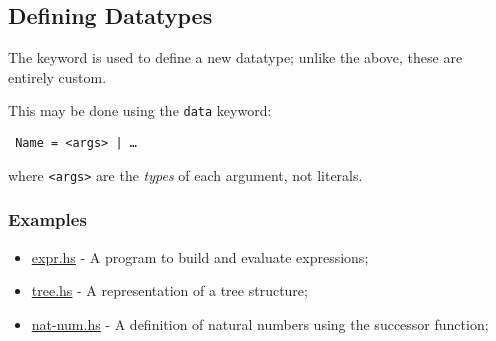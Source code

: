 \subsection{Defining Datatypes}
The  keyword is used to define a new datatype; unlike the above, these are entirely custom.

This may be done using the \texttt{data} keyword:
\begin{center}
  \texttt{ Name =  <args> | \ldots}
\end{center}
where \texttt{<args>} are the \textit{types} of each argument, not literals.

\subsubsection{Examples}
\begin{itemize}
  \item \url{expr.hs} - A program to build and evaluate expressions;
  \item \url{tree.hs} - A representation of a tree structure;
  \item \url{nat-num.hs} - A definition of natural numbers using the successor function;
\end{itemize}